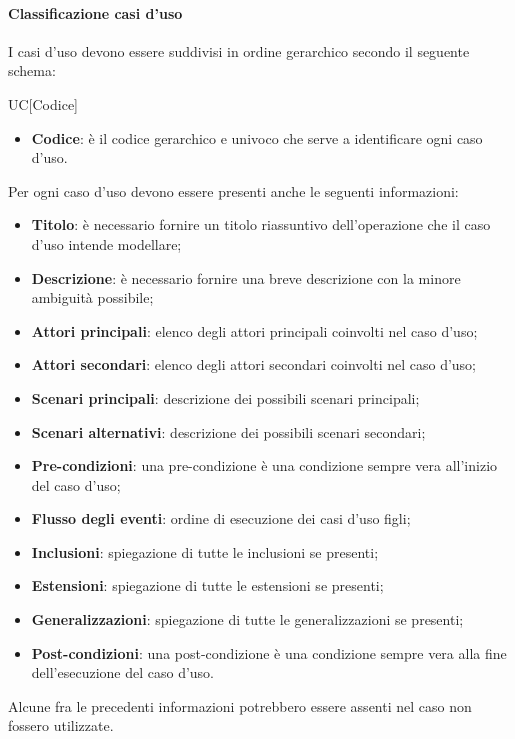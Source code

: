 \paragraph{Classificazione casi d'uso}
I casi d'uso devono essere suddivisi in ordine gerarchico secondo il seguente schema:
\begin{center}
	UC[Codice]
\end{center}

	\begin{itemize}
		\item \textbf{Codice}: è il codice gerarchico e univoco che serve a identificare ogni caso d'uso.
	\end{itemize}
Per ogni caso d'uso devono essere presenti anche le seguenti informazioni:
	\begin{itemize}
		\item \textbf{Titolo}: è necessario fornire un titolo riassuntivo dell'operazione che il caso d'uso intende modellare;
		\item \textbf{Descrizione}: è necessario fornire una breve descrizione con la minore ambiguità possibile;
		\item \textbf{Attori principali}: elenco degli attori principali coinvolti nel caso d'uso;
		\item \textbf{Attori secondari}: elenco degli attori secondari coinvolti nel caso d'uso;
		\item \textbf{Scenari principali}: descrizione dei possibili scenari principali;
		\item \textbf{Scenari alternativi}: descrizione dei possibili scenari secondari;
		\item \textbf{Pre-condizioni}: una pre-condizione è una condizione sempre vera all'inizio del caso d'uso;
		\item \textbf{Flusso degli eventi}: ordine di esecuzione dei casi d'uso figli;
		\item \textbf{Inclusioni}: spiegazione di tutte le inclusioni se presenti;
		\item \textbf{Estensioni}: spiegazione di tutte le estensioni se presenti;
		\item \textbf{Generalizzazioni}: spiegazione di tutte le generalizzazioni se presenti;
		\item \textbf{Post-condizioni}: una post-condizione è una condizione sempre vera alla fine dell'esecuzione del caso d'uso.
	\end{itemize}
Alcune fra le precedenti informazioni potrebbero essere assenti nel caso non fossero utilizzate.

